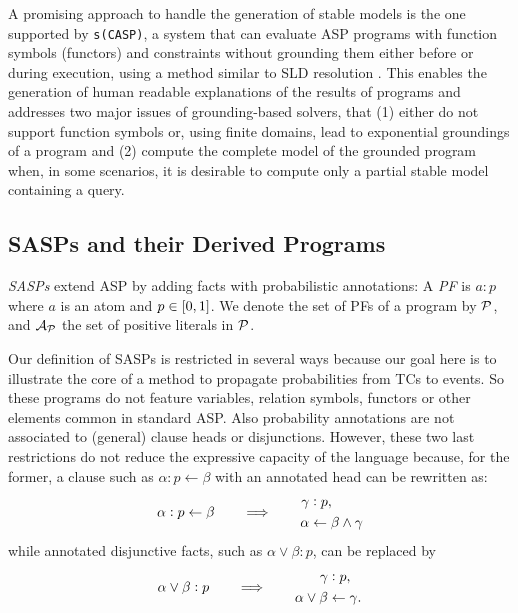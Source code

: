 \documentclass{tlp}
\renewcommand{\cite}{\citep}
\newcommand{\eat}[1]{}
\newcommand{\cla}[1]{\ensuremath{{\cal #1}}}        %
\newcommand{\clause}{\ensuremath{\leftarrow}}
\newcommand{\ATOMSset}{\ensuremath{\cla{A}}}
\newcommand{\PATOMset}{\ensuremath{\ATOMSset_{\cla{P}}}}
\newcommand{\PROBFset}{\ensuremath{\cla{P}}}
\newcommand{\probfact}[2]{\ensuremath{#1:#2}}
\newcommand{\probrule}[3]{\probfact{#1}{#2} \leftarrow #3}
\newcommand{\franc}[1]{{\color{green!30!black}#1}}
\begin{document}
A promising approach to handle the generation of stable models is the
one supported by \texttt{s(CASP)}, a system that can evaluate ASP
programs with function symbols (functors) and constraints without
grounding them either before or during execution, using a method
similar to SLD resolution
\cite{marple2017computing,arias2020justifications}.  This enables the
generation of human readable explanations of the results of programs
and addresses two major issues of grounding-based solvers, that %
   (1) either do not support function symbols or, using finite domains,
       lead to exponential groundings of a program and %
   (2) compute the complete model of the grounded program when, in some
       scenarios, it is desirable to compute only a partial stable model
       containing a query.
 

\subsection*{\acsp{SASP} and their Derived Programs}

\emph{\Acfp{SASP}} extend \ac{ASP} by adding facts with probabilistic
annotations: A \textit{\ac{PF}} is \(\probfact{a}{p}\) where \(a\) is
an atom and \(p\in\intcc{0,1}\).  We denote the set of \aclp{PF} of a
program by \(\PROBFset\), and \(\PATOMset\) the set of positive
literals in \(\PROBFset\).

\eat{\franc{Discuss probabilities in the head of rules and in
    disjunctions (?).}}%

\franc{%
  Our definition of \acp{SASP} is restricted in several ways because
  our goal here is to illustrate the core of a method to propagate
  probabilities from \aclp{TC} to events.  So these programs do not
  feature variables, relation symbols, functors or other elements
  common in standard \ac{ASP}.  Also probability annotations are not
  associated to (general) clause heads or disjunctions.  However,
  these two last restrictions do not reduce the expressive capacity of
  the language because, for the former, a clause such as
  \( \probrule{\alpha}{p}{\beta} \) with an annotated head can be
  rewritten as:
  \begin{equation*}
    \probrule{\alpha}{p}{\beta} \qquad \Longrightarrow \qquad
    \begin{aligned}
        \probfact{\gamma & }{p}, \\
        \alpha           & \clause \beta \wedge \gamma
    \end{aligned}
  \end{equation*}
  while annotated disjunctive facts, such as
    \( \probfact{\alpha \vee \beta}{p} \),
  can be replaced by
  \begin{equation*}
    \probfact{\alpha \vee \beta}{p} \qquad \Longrightarrow \qquad 
    \begin{aligned}
        \probfact{\gamma  & }{p}, \\
        \alpha \vee \beta & \clause \gamma.
    \end{aligned}
  \end{equation*}
}
\end{document}

